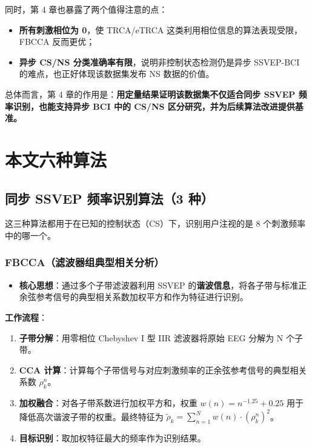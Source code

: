 \documentclass[12pt, a4paper]{ctexart}
\begin{document}
同时，第 4 章也暴露了两个值得注意的点：

\begin{itemize}
  \item \textbf{所有刺激相位为 0}，使 TRCA/eTRCA 这类利用相位信息的算法表现受限，FBCCA 反而更优；
  \item \textbf{异步 CS/NS 分类准确率有限}，说明非控制状态检测仍是异步 SSVEP-BCI 的难点，也正好体现该数据集发布 NS 数据的价值。
\end{itemize}

总体而言，第 4 章的作用是：\textbf{用定量结果证明该数据集不仅适合同步 SSVEP 频率识别，也能支持异步 BCI 中的 CS/NS 区分研究，并为后续算法改进提供基准。}

\section{本文六种算法}

\subsection{同步 SSVEP 频率识别算法（3 种）}

这三种算法都用于在已知的控制状态（CS）下，识别用户注视的是 8 个刺激频率中的哪一个。

\subsubsection*{FBCCA（滤波器组典型相关分析）}

\begin{itemize}
  \item \textbf{核心思想}：通过多个子带滤波器利用 SSVEP 的\textbf{谐波信息}，将各子带与标准正余弦参考信号的典型相关系数加权平方和作为特征进行识别。
\end{itemize}

\textbf{工作流程}：

\begin{enumerate}
  \item \textbf{子带分解}：用零相位 Chebyshev I 型 IIR 滤波器将原始 EEG 分解为 N 个子带。
  \item \textbf{CCA 计算}：计算每个子带信号与对应刺激频率的正余弦参考信号的典型相关系数 $\rho_{k}^{n}$。
  \item \textbf{加权融合}：对各子带系数进行加权平方和，权重 $w(n) = n^{-1.25} + 0.25$ 用于降低高次谐波子带的权重。最终特征为 $\tilde{\rho}_{k} = \sum_{n=1}^{N} w(n) \cdot (\rho_{k}^{n})^{2}$。
  \item \textbf{目标识别}：取加权特征最大的频率作为识别结果。
\end{enumerate}
\end{document}
